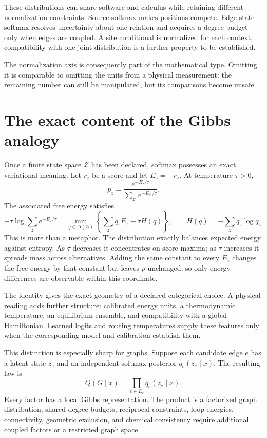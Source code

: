 These distributions can share software and calculus while retaining different normalization
constraints.  Source-softmax makes positions compete.  Edge-state softmax resolves uncertainty
about one relation and acquires a degree budget only when edges are coupled.  A site conditional is
normalized for each context; compatibility with one joint distribution is a further property to be
established.

The normalization axis is consequently part of the mathematical type.  Omitting it is comparable
to omitting the units from a physical measurement: the remaining number can still be manipulated,
but its comparisons become unsafe.

\section{The exact content of the Gibbs analogy}

Once a finite state space $\mathcal Z$ has been declared, softmax possesses an exact variational
meaning.  Let $r_z$ be a score and let $E_z=-r_z$.  At temperature $\tau>0$,
\begin{equation}
p_z=\frac{e^{-E_z/\tau}}{\sum_{z'}e^{-E_{z'}/\tau}}.
\label{eq:book-local-gibbs}
\end{equation}
The associated free energy satisfies
\begin{equation}
-\tau\log\sum_z e^{-E_z/\tau}
=\min_{q\in\Delta(\mathcal Z)}
\left\{\sum_zq_zE_z-\tau H(q)\right\},
\qquad H(q)=-\sum_zq_z\log q_z.
\label{eq:book-free-energy}
\end{equation}
This is more than a metaphor.  The distribution exactly balances expected energy against entropy.
As $\tau$ decreases it concentrates on score maxima; as $\tau$ increases it spreads mass across
alternatives.  Adding the same constant to every $E_z$ changes the free energy by that constant but
leaves $p$ unchanged, so only energy differences are observable within this coordinate.

The identity gives the exact geometry of a declared categorical choice.  A physical reading adds
further structure: calibrated energy units, a thermodynamic temperature, an equilibrium ensemble,
and compatibility with a global Hamiltonian.  Learned logits and routing temperatures supply these
features only when the corresponding model and calibration establish them.

This distinction is especially sharp for graphs.  Suppose each candidate edge $e$ has a latent
state $z_e$ and an independent softmax posterior $q_e(z_e\mid x)$.  The resulting law is
\begin{equation}
Q(G\mid x)=\prod_{e\in E_c}q_e(z_e\mid x).
\label{eq:book-factorized-graph}
\end{equation}
Every factor has a local Gibbs representation.  The product is a factorized graph distribution;
shared degree budgets, reciprocal constraints, loop energies, connectivity, geometric exclusion,
and chemical consistency require additional coupled factors or a restricted graph space.

